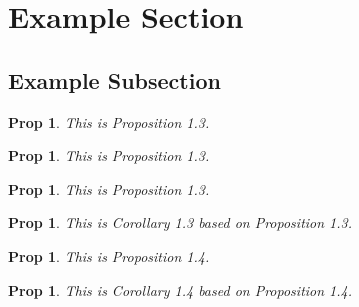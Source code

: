 \documentclass{ltjsarticle}
\newtheorem{prop}[thm]{Prop}
\theoremstyle{corollarystyle}
\newtheorem{cor}[thm]{Prop} %
\begin{document}
\section*{Example Section}
\subsection*{Example Subsection}

\begin{prop}
This is Proposition 1.3.
\end{prop}
\begin{prop}
  This is Proposition 1.3.
\end{prop}
\begin{prop}
  This is Proposition 1.3.
\end{prop}

\setcounter{subsection}{5}
\begin{cor}
This is Corollary 1.3 based on Proposition 1.3.
\end{cor}

\begin{prop}
This is Proposition 1.4.
\end{prop}

\begin{cor}
This is Corollary 1.4 based on Proposition 1.4.
\end{cor}
\end{document}
